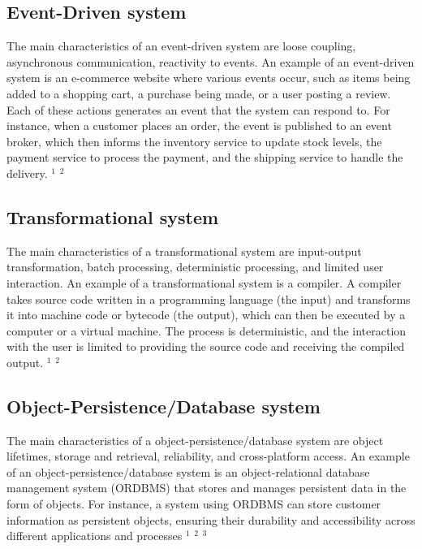 \subsection{Event-Driven system}
The main characteristics of an event-driven system are loose coupling, asynchronous communication, reactivity to events. An example of an event-driven system is an e-commerce website where various events occur, such as items being added to a shopping cart, a purchase being made, or a user posting a review. Each of these actions generates an event that the system can respond to. For instance, when a customer places an order, the event is published to an event broker, which then informs the inventory service to update stock levels, the payment service to process the payment, and the shipping service to handle the delivery.
\href{https://aws.amazon.com/event-driven-architecture/}{$^1$}
\href{https://blog.hubspot.com/website/event-driven-architecture}{$^2$}

\subsection{Transformational system}
The main characteristics of a transformational system are input-output transformation, batch processing, deterministic processing, and limited user interaction. 
An example of a transformational system is a compiler. A compiler takes source code written in a programming language (the input) and transforms it into machine code or bytecode (the output), which can then be executed by a computer or a virtual machine. The process is deterministic, and the interaction with the user is limited to providing the source code and receiving the compiled output. 
\href{https://www.itma.vt.edu/courses/d4l2/lesson_2.php}{$^1$}
\href{https://en.wikipedia.org/wiki/System}{$^2$}

\subsection{Object-Persistence/Database system}
The main characteristics of a object-persistence/database system are object lifetimes, storage and retrieval, reliability, and cross-platform access. An example of an object-persistence/database system is an object-relational database management system (ORDBMS) that stores and manages persistent data in the form of objects. For instance, a system using ORDBMS can store customer information as persistent objects, ensuring their durability and accessibility across different applications and processes
\href{https://study.com/academy/lesson/object-persistence-definition-overview.html}{$^1$}
\href{https://www.infoworld.com/article/2076943/object-persistence-and-java.html}{$^2$}
\href{https://www.tutorialspoint.com/encapsulation-of-operations-and-persistence-of-objects}{$^3$}

